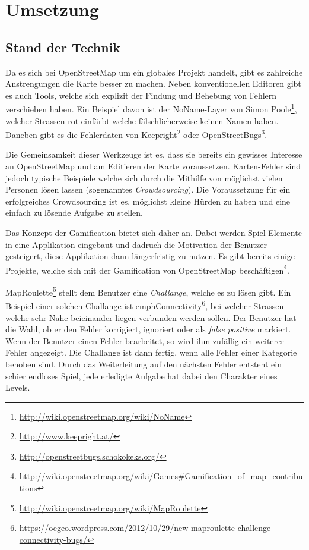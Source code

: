 \chapter{Umsetzung}
\label{umsetzung}

\section{Stand der Technik}
Da es sich bei \gls{OpenStreetMap} um ein globales Projekt handelt, gibt es zahlreiche Anstrengungen die Karte besser zu machen.
Neben konventionellen Editoren gibt es auch Tools, welche sich explizit der Findung und Behebung von Fehlern verschieben haben.
Ein Beispiel davon ist der NoName-Layer von Simon Poole\footnote{\url{http://wiki.openstreetmap.org/wiki/NoName}}, welcher Strassen rot einfärbt welche fälschlicherweise keinen Namen haben.
Daneben gibt es die Fehlerdaten von Keepright\footnote{\url{http://www.keepright.at/}} oder OpenStreetBugs\footnote{\url{http://openstreetbugs.schokokeks.org/}}.

Die Gemeinsamkeit dieser Werkzeuge ist es, dass sie bereits ein gewisses Interesse an \gls{OpenStreetMap} und am Editieren der Karte voraussetzen.
Karten-Fehler sind jedoch typische Beispiele welche sich durch die Mithilfe von möglichst vielen Personen lösen lassen (sogenanntes \emph{Crowdsourcing}).
Die Voraussetzung für ein erfolgreiches Crowdsourcing ist es, möglichst kleine Hürden zu haben und eine einfach zu lösende Aufgabe zu stellen.

Das Konzept der Gamification bietet sich daher an.
Dabei werden Spiel-Elemente in eine Applikation eingebaut und dadruch die Motivation der Benutzer gesteigert, diese Applikation dann längerfristig zu nutzen.
Es gibt bereits einige Projekte, welche sich mit der Gamification von OpenStreetMap beschäftigen\footnote{\url{http://wiki.openstreetmap.org/wiki/Games\#Gamification_of_map_contributions}}.

MapRoulette\footnote{\url{http://wiki.openstreetmap.org/wiki/MapRoulette}} stellt dem Benutzer eine \emph{Challange}, welche es zu lösen gibt.
Ein Beispiel einer solchen Challange ist emph{Connectivity}\footnote{\url{https://oegeo.wordpress.com/2012/10/29/new-maproulette-challenge-connectivity-bugs/}}, bei welcher Strassen welche sehr Nahe beieinander liegen verbunden werden sollen.
Der Benutzer hat die Wahl, ob er den Fehler korrigiert, ignoriert oder als \emph{false positive} markiert.
Wenn der Benutzer einen Fehler bearbeitet, so wird ihm zufällig ein weiterer Fehler angezeigt.
Die Challange ist dann fertig, wenn alle Fehler einer Kategorie behoben sind.
Durch das Weiterleitung auf den nächsten Fehler entsteht ein schier endloses Spiel, jede erledigte Aufgabe hat dabei den Charakter eines Levels.

